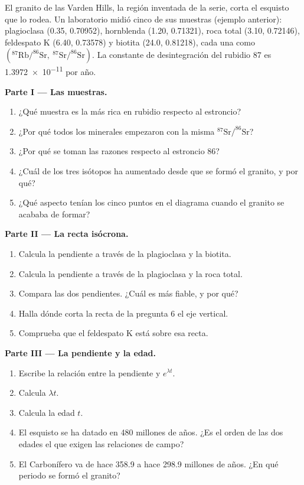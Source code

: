 \begin{problem}
\label{pb:g12:age-of-the-earth:1}
El granito de las Varden Hills, la región inventada de la serie, corta el
esquisto que lo rodea. Un laboratorio midió cinco de sus muestras (ejemplo
anterior): plagioclasa (0.35, 0.70952), hornblenda (1.20, 0.71321), roca total
(3.10, 0.72146), feldespato K (6.40, 0.73578) y biotita (24.0, 0.81218), cada
una como
$(^{87}\mathrm{Rb}/^{86}\mathrm{Sr},\ ^{87}\mathrm{Sr}/^{86}\mathrm{Sr})$. La
constante de desintegración del rubidio 87 es \num{1.3972e-11} por año.

\medskip
\noindent\textbf{Parte I --- Las muestras.}
\begin{enumerate}
  \item ¿Qué muestra es la más rica en rubidio respecto al estroncio?
  \item ¿Por qué todos los minerales empezaron con la misma
        $^{87}\mathrm{Sr}/^{86}\mathrm{Sr}$?
  \item ¿Por qué se toman las razones respecto al estroncio 86?
  \item ¿Cuál de los tres isótopos ha aumentado desde que se formó el granito,
        y por qué?
  \item ¿Qué aspecto tenían los cinco puntos en el diagrama cuando el granito
        se acababa de formar?
\end{enumerate}

\medskip
\noindent\textbf{Parte II --- La recta isócrona.}
\begin{enumerate}[resume]
  \item Calcula la pendiente a través de la plagioclasa y la biotita.
  \item Calcula la pendiente a través de la plagioclasa y la roca total.
  \item Compara las dos pendientes. ¿Cuál es más fiable, y por qué?
  \item Halla dónde corta la recta de la pregunta 6 el eje vertical.
  \item Comprueba que el feldespato K está sobre esa recta.
\end{enumerate}

\medskip
\noindent\textbf{Parte III --- La pendiente y la edad.}
\begin{enumerate}[resume]
  \item Escribe la relación entre la pendiente y $e^{\lambda t}$.
  \item Calcula $\lambda t$.
  \item Calcula la edad $t$.
  \item El esquisto se ha datado en 480 millones de años. ¿Es el orden de las
        dos edades el que exigen las relaciones de campo?
  \item El Carbonífero va de hace 358.9 a hace 298.9 millones de años. ¿En
        qué periodo se formó el granito?
\end{enumerate}


\end{problem}
